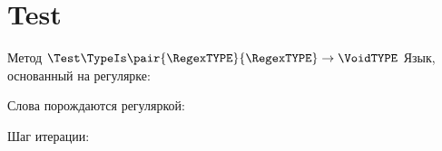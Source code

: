 \section{Test}
\begin{frame}{Метод $\Test\TypeIs\pair{\RegexTYPE}{\RegexTYPE}\to\VoidTYPE$}
    Язык, основанный на регулярке:


    Слова порождаются регуляркой:

    Шаг итерации:


\end{frame}
